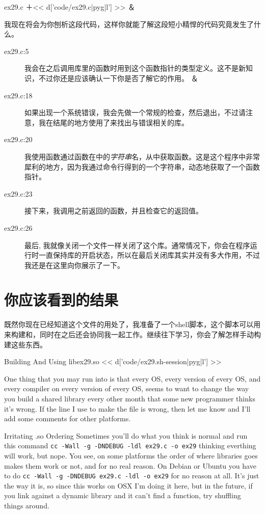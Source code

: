 \begin{code+}{ex29.c}
＋<< d['code/ex29.c|pyg|l'] >>
＆

我现在将会为你刨析这段代码，这样你就能了解这段短小精悍的代码究竟发生了什么。

\begin{description}
\item[ex29.c:5] 我会在之后调用库里的函数时用到这个函数指针的类型定义。这不是新知识，不过你还是应该确认一下你是否了解它的作用。
    ＆
\item[ex29.c:18] 如果出现一个系统错误，我会先做一个常规的检查，然后退出，不过请注意，我在结尾的地方使用了来找出与错误相关的库。
\item[ex29.c:20] 我使用函数通过函数在中的\emph{字符串}名，从中获取函数。这是这个程序中非常犀利的地方，因为我通过命令行得到的一个字符串，动态地获取了一个函数指针。
\item[ex29.c:23] 接下来，我调用之前返回的函数，并且检查它的返回值。
\item[ex29.c:26] 最后, 我就像关闭一个文件一样关闭了这个库。通常情况下，你会在程序运行时一直保持库的开启状态，所以在最后关闭库其实并没有多大作用，不过我还是在这里向你展示了一下。
\end{description}

\section{你应该看到的结果}

既然你现在已经知道这个文件的用处了，我准备了一个shell脚本，这个脚本可以用来构建和，同时在之后还会协同我一起工作。继续往下学习，你会了解怎样手动构建这些东西。

\begin{code}{Building And Using libex29.so}
<< d['code/ex29.sh-session|pyg|l'] >>
\end{code}

One thing that you may run into is that every OS, every version of every
OS, and every compiler on every version of every OS, seems to want to change
the way you build a shared library every other month that some new programmer
thinks it's wrong.  If the line I use to make the  file is
wrong, then let me know and I'll add some comments for other platforms.

\begin{aside}{Irritating .so Ordering}
Sometimes you'll do what you think is normal and run this command
\verb|cc -Wall -g -DNDEBUG -ldl ex29.c -o ex29| thinking everthing
will work, but nope.  You see, on some platforms the order of where 
libraries goes makes them work or not, and for no real reason.  On
Debian or Ubuntu you have to do
\verb|cc -Wall -g -DNDEBUG ex29.c -ldl -o ex29| for no reason at all.
It's just the way it is, so since this works on OSX I'm doing it
here, but in the future, if you link against a dynamic library and
it can't find a function, try shuffling things around.


\end{aside}
\end{code+}
